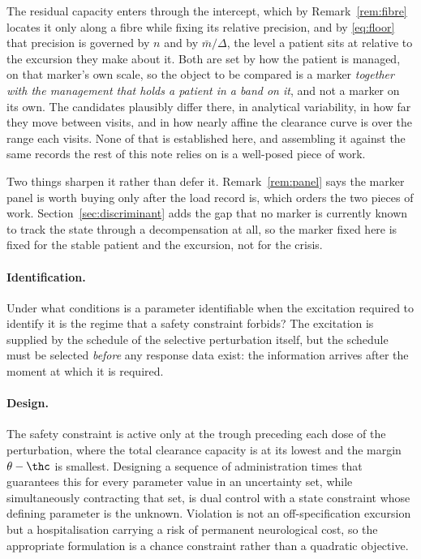 The residual capacity enters through the intercept, which by Remark~\ref{rem:fibre} locates
it only along a fibre while fixing its relative precision, and by \eqref{eq:floor} that
precision is governed by $n$ and by $\bar m/\Delta$, the level a patient sits at relative to
the excursion they make about it. Both are set by how the patient is managed, on that
marker's own scale, so the object to be compared is a marker \emph{together with the
management that holds a patient in a band on it}, and not a marker on its own. The
candidates plausibly differ there, in analytical variability, in how far they move between
visits, and in how nearly affine the clearance curve is over the range each visits. None of
that is established here, and assembling it against the same records the rest of this note
relies on is a well-posed piece of work.

Two things sharpen it rather than defer it. Remark~\ref{rem:panel} says the marker panel is
worth buying only after the load record is, which orders the two pieces of work.
Section~\ref{sec:discriminant} adds the gap that no marker is currently known to track the
state through a decompensation at all, so the marker fixed here is fixed for the stable
patient and the excursion, not for the crisis.

\paragraph{Identification.} Under what conditions is a parameter identifiable when the
excitation required to identify it is the regime that a safety constraint forbids? The
excitation is supplied by the schedule of the selective perturbation itself, but the
schedule must be selected \emph{before} any response data exist: the information arrives
after the moment at which it is required.

\paragraph{Design.} The safety constraint is active only at the trough preceding each dose
of the perturbation, where the total clearance capacity is at its lowest and the margin
$\theta - \thc$ is smallest. Designing a sequence of administration times that guarantees
this for every parameter value in an uncertainty set, while simultaneously contracting that
set, is dual control with a state constraint whose defining parameter is the unknown.
Violation is not an off-specification excursion but a hospitalisation carrying a risk of
permanent neurological cost, so the appropriate formulation is a chance constraint rather
than a quadratic objective.

